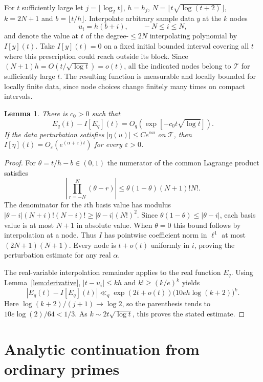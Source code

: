 \documentclass[11pt]{article}
\newtheorem{lemma}[theorem]{Lemma}
\newcommand{\eps}{\varepsilon}
\begin{document}
For $t$ sufficiently large let $j=\lfloor\log_2 t\rfloor$, $h=h_j$,
$N=\lfloor t\sqrt{\log(t+2)}\rfloor$, $k=2N+1$ and $b=\lfloor t/h\rfloor$. Interpolate arbitrary sample data $y$ at the $k$ nodes
\[
 u_i=h(b+i),\qquad -N\le i\le N ,
\]
and denote the value at $t$ of the degree-$\le2N$ interpolating polynomial by $I[y](t)$. Take $I[y](t)=0$ on a fixed initial bounded interval covering all $t$ where this prescription could reach outside its block. Since $(N+1)h=O(t/\sqrt{\log t})=o(t)$, all the indicated nodes belong to $\mathcal T$ for sufficiently large $t$. The resulting function is measurable and locally bounded for locally finite data, since node choices change finitely many times on compact intervals.

\begin{lemma}\label{lem:interp}
There is $c_0>0$ such that
\[
 E_q(t)-I[E_q](t)=O_q\!\left(\exp[-c_0t\sqrt{\log t}]\right).
\]
If the data perturbation satisfies $|\eta(u)|\le C e^{\alpha u}$ on $\mathcal T$, then $I[\eta](t)=O_{\eps}(e^{(\alpha+\eps)t})$ for every $\eps>0$.
\end{lemma}
\begin{proof}
For $\theta=t/h-b\in(0,1)$ the numerator of the common Lagrange product satisfies
\[
 \left|\prod_{r=-N}^N(\theta-r)\right|
 \le\theta(1-\theta)(N+1)!N!.
\]
The denominator for the $i$th basis value has modulus
$|\theta-i|(N+i)!(N-i)!\ge |\theta-i|(N!)^2$.
Since $\theta(1-\theta)\le|\theta-i|$, each basis value is at most $N+1$ in absolute value. When $\theta=0$ this bound follows by interpolation at a node. Thus $I$ has pointwise coefficient norm in $\ell^1$ at most $(2N+1)(N+1)$. Every node is $t+o(t)$ uniformly in $i$, proving the perturbation estimate for any real $\alpha$.

The real-variable interpolation remainder applies to the real function $E_q$. Using Lemma~\ref{lem:derivative}, $|t-u_i|\le kh$ and $k!\ge(k/e)^k$ yields
\[
 |E_q(t)-I[E_q](t)|
 \ll_q \exp(2t+o(t))\bigl(10 e h\log(k+2)\bigr)^k .
\]
Here $\log(k+2)/(j+1)\to\log 2$, so the parenthesis tends to
$10e\log(2)/64<1/3$. As $k\sim2t\sqrt{\log t}$, this proves the stated estimate.
\end{proof}

\section{Analytic continuation from ordinary primes}
\end{document}

